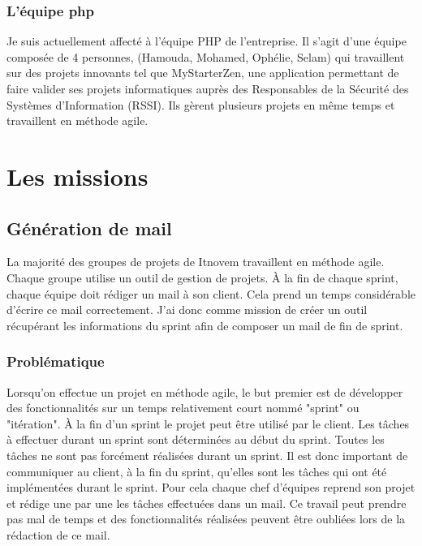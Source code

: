 \documentclass[12pt, twoside, openright]{report}
\begin{document}
\subsection{L'équipe php}

Je suis actuellement affecté à l'équipe PHP de l'entreprise. Il s'agit d'une équipe composée de 4 personnes, (Hamouda, Mohamed, Ophélie, Selam) qui travaillent sur des projets innovants tel que MyStarterZen, une application permettant de faire valider ses projets informatiques auprès des Responsables de la Sécurité des Systèmes d'Information (RSSI). Ils gèrent plusieurs projets en même temps et travaillent en méthode agile. 

\chapter{Les missions}

\section{Génération de mail}

La majorité des groupes de projets de Itnovem travaillent en méthode agile. Chaque groupe utilise un outil de gestion de projets. À la fin de chaque sprint, chaque équipe doit rédiger un mail à son client. Cela prend un temps considérable d'écrire ce mail correctement. J'ai donc comme mission de créer un outil récupérant les informations du sprint afin de composer un mail de fin de sprint.

\subsection{Problématique}

Lorsqu’on effectue un projet en méthode agile, le but premier est de développer des fonctionnalités sur un temps relativement court nommé "sprint" ou "itération". À la fin d'un sprint le projet peut être utilisé par le client. Les tâches à effectuer durant un sprint sont déterminées au début du sprint. Toutes les tâches ne sont pas forcément réalisées durant un sprint. Il est donc important de communiquer au client, à la fin du sprint, qu'elles sont les tâches qui ont été implémentées durant le sprint. Pour cela chaque chef d'équipes reprend son projet et rédige une par une les tâches effectuées dans un mail. Ce travail peut prendre pas mal de temps et des fonctionnalités réalisées peuvent être oubliées lors de la rédaction de ce mail. 
\end{document}
